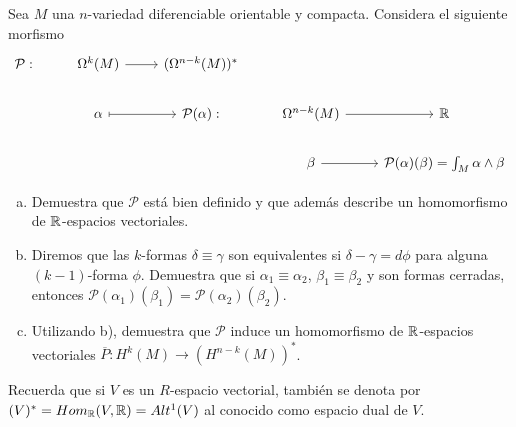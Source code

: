 \documentclass[twoside]{article}
\begin{document}
\begin{ejercicio}{4}
Sea $M$ una $n$-variedad diferenciable orientable y compacta. Considera el siguiente morfismo
\[
\begin{tikzcd}
\mathcal{P}: & \Omega^k(M)\arrow[r]    & (\Omega^{n-k}(M))^*  &                  & \\
             & \alpha\arrow[r, mapsto] & \mathcal{P}(\alpha): & \Omega^{n-k}(M)\arrow[r]  & \R\\
             &		                   &					  &  \beta\arrow[r]  &\mathcal{P}(\alpha)(\beta)=\int_M \alpha\land\beta
\end{tikzcd}
\]
\begin{enumerate}[a)]
\item Demuestra que $\mathcal{P}$ está bien definido y que además describe un homomorfismo de $\mathbb{R}$-espacios vectoriales.
\item Diremos que las $k$-formas $\delta\equiv\gamma$ son equivalentes si $\delta-\gamma=d\phi$ para alguna $(k-1)$-forma $\phi$. Demuestra que si $\alpha_1\equiv \alpha_2$, $\beta_1\equiv\beta_2$ y son formas cerradas, entonces $\mathcal{P}(\alpha_1)(\beta_1)=\mathcal{P}(\alpha_2)(\beta_2)$. 
\item Utilizando b), demuestra que $\mathcal{P}$ induce un homomorfismo de $\mathbb{R}$-espacios vectoriales $\overline{P}:H^k(M)\to (H^{n-k}(M))^*$.
\end{enumerate}
\begin{nota}
Recuerda que si $V$ es un $R$-espacio vectorial, también se denota por $(V)^*=Hom_{\mathbb{R}}(V,\mathbb{R})=Alt^1(V)$ al conocido como espacio dual de $V$.
\end{nota}
\end{ejercicio}
\end{document}
